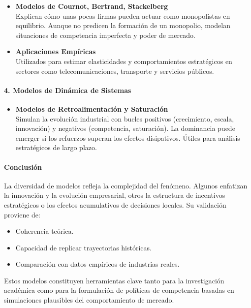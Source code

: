 \documentclass[a4paper,12pt]{article}
\begin{document}
\begin{itemize}
    \item \textbf{Modelos de Cournot, Bertrand, Stackelberg}\\
    Explican cómo unas pocas firmas pueden actuar como monopolistas en equilibrio. Aunque no predicen la formación de un monopolio, modelan situaciones de competencia imperfecta y poder de mercado.

    \item \textbf{Aplicaciones Empíricas}\\
    Utilizados para estimar elasticidades y comportamientos estratégicos en sectores como telecomunicaciones, transporte y servicios públicos.
\end{itemize}

\paragraph{4. Modelos de Dinámica de Sistemas}

\begin{itemize}
    \item \textbf{Modelos de Retroalimentación y Saturación}\\
    Simulan la evolución industrial con bucles positivos (crecimiento, escala, innovación) y negativos (competencia, saturación). La dominancia puede emerger si los refuerzos superan los efectos disipativos. Útiles para análisis estratégicos de largo plazo.
\end{itemize}

\paragraph{Conclusión}

La diversidad de modelos refleja la complejidad del fenómeno. Algunos enfatizan la innovación y la evolución empresarial, otros la estructura de incentivos estratégicos o los efectos acumulativos de decisiones locales. Su validación proviene de:

\begin{itemize}
    \item Coherencia teórica.
    \item Capacidad de replicar trayectorias históricas.
    \item Comparación con datos empíricos de industrias reales.
\end{itemize}

Estos modelos constituyen herramientas clave tanto para la investigación académica como para la formulación de políticas de competencia basadas en simulaciones plausibles del comportamiento de mercado.
\end{document}
